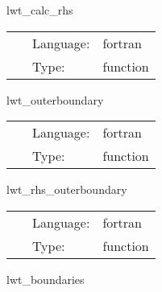 \documentclass{article}
\begin{document}

\hspace{5mm} lwt\_calc\_rhs 

\hspace{5mm}{\it calculate the rhs } 


\hspace{5mm}

 \begin{tabular*}{160mm}{cll} 
~ & Language:  & fortran \\ 
~ & Type:  & function \\ 
\end{tabular*} 


\vspace{5mm}


\hspace{5mm} lwt\_outerboundary 

\hspace{5mm}{\it apply outer boundaries } 


\hspace{5mm}

 \begin{tabular*}{160mm}{cll} 
~ & Language:  & fortran \\ 
~ & Type:  & function \\ 
\end{tabular*} 


\vspace{5mm}


\hspace{5mm} lwt\_rhs\_outerboundary 

\hspace{5mm}{\it apply mol rhs outer boundaries (eg. radiative boundary condition) } 


\hspace{5mm}

 \begin{tabular*}{160mm}{cll} 
~ & Language:  & fortran \\ 
~ & Type:  & function \\ 
\end{tabular*} 


\vspace{5mm}


\hspace{5mm} lwt\_boundaries 
\end{document}
